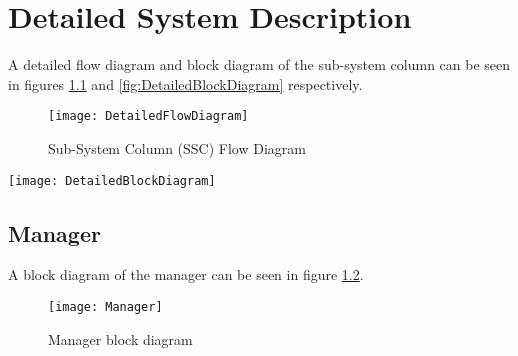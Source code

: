 

\chapter{Detailed System Description}
\label{sec:Detailed System Description}

A detailed flow diagram and block diagram of the sub-system column can be seen in figures \ref{fig:DetailedFlowDiagram} and \ref{fig:DetailedBlockDiagram} respectively.
\begin{figure}[h]
\centering
\captionsetup{justification=centering}
\captionsetup{width=.9\linewidth}
\centerline{
\mbox{\texttt{[image: DetailedFlowDiagram]}}
}
\center\caption{Sub-System Column (SSC) Flow Diagram}
\label{fig:DetailedFlowDiagram}
\end{figure}

\begin{sidewaysfigure}[h]
\centering
\captionsetup{justification=centering}
\captionsetup{width=0.9\textwidth}
\centerline{
\mbox{\texttt{[image: DetailedBlockDiagram]}}
}
\center\caption{Sub-System Column (SSC) Block Diagram}
\label{fig:DetailedBlockDiagram}
\end{sidewaysfigure}

\section{Manager}
\label{sec:manager}

A block diagram of the manager can be seen in figure \ref{fig:Manager block diagram}.
\begin{figure}[h]
\centering
\captionsetup{justification=centering}
\captionsetup{width=.9\linewidth}
\centerline{
\mbox{\texttt{[image: Manager]}}
}
\center\caption{Manager block diagram}
\label{fig:Manager block diagram}
\end{figure}

